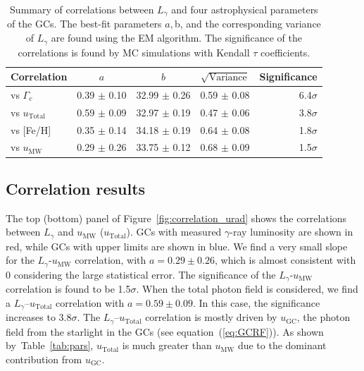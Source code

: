 \documentclass[doublespace,nopageskip]{VTthesis} %
\begin{document}
\begin{table}
\centering
\caption{Summary of correlations between $L_\gamma$ and four astrophysical parameters of the GCs. The best-fit parameters $a, $b, and the corresponding variance of $L_\gamma$ are found using the EM algorithm. The significance of the correlations is found by MC simulations with Kendall $\tau$ coefficients.}
\label{tab:correlation}
\begin{tabular}{lcccr}
\hline
 Correlation & $a$ & $b$ & $\sqrt{\text{Variance}}$ & Significance\\
\hline
vs $\Gamma_c$ & 0.39 $\pm$ 0.10 & 32.99 $\pm$ 0.26 & 0.59 $\pm$ 0.08 & 6.4$\sigma$\\
vs $u_{\mathrm{Total}}$ & 0.59 $\pm$ 0.09 & 32.97 $\pm$ 0.19 & 0.47 $\pm$ 0.06 & 3.8$\sigma$\\
vs [Fe/H] & 0.35 $\pm$ 0.14 & 34.18 $\pm$ 0.19 & 0.64 $\pm$ 0.08 & 1.8$\sigma$\\
vs $u_\mathrm{MW}$ & 0.29 $\pm$ 0.26 & 33.75 $\pm$ 0.12 & 0.68 $\pm$ 0.09 & 1.5$\sigma$\\
\hline
\end{tabular}
\end{table}

\subsection{Correlation results}

The top (bottom) panel of Figure~\ref{fig:correlation_urad} shows the correlations between $L_\gamma$ and $u_\mathrm{MW}$ ($u_\mathrm{Total}$). GCs with measured $\gamma$-ray luminosity are shown in red, while GCs with upper limits are shown in blue. We find a very small slope for the $L_\gamma$-$u_\mathrm{MW}$ correlation, with $a=0.29 \pm 0.26$, which is almost consistent with 0 considering the large statistical error. The significance of the $L_\gamma$-$u_\mathrm{MW}$ correlation is found to be 1.5$\sigma$. When the total photon field is considered, we find a $L_\gamma$--$u_\mathrm{Total}$ correlation with $a = 0.59 \pm 0.09$. In this case, the significance increases to 3.8$\sigma$. The $L_\gamma$--$u_\mathrm{Total}$ correlation is mostly driven by $u_\mathrm{GC}$, the photon field from the starlight in the GCs (see equation~(\ref{eq:GCRF})). As shown by~Table~\ref{tab:pars}, $u_\mathrm{Total}$ is much greater than $u_\mathrm{MW}$ due to the dominant contribution from $u_\mathrm{GC}$. 
\end{document}
